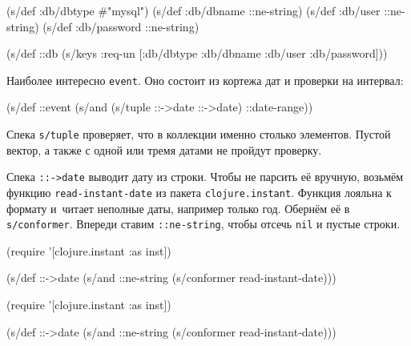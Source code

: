 \begin{english}
  \begin{clojure}
(s/def :db/dbtype   #{"mysql"})
(s/def :db/dbname   ::ne-string)
(s/def :db/user     ::ne-string)
(s/def :db/password ::ne-string)

(s/def ::db
  (s/keys :req-un [:db/dbtype
                   :db/dbname
                   :db/user
                   :db/password]))
  \end{clojure}
\end{english}

Наиболее интересно \verb|event|. Оно состоит из кортежа дат и проверки на
интервал:

\begin{english}
  \begin{clojure}
(s/def ::event
  (s/and (s/tuple ::->date ::->date)
         ::date-range))
  \end{clojure}
\end{english}


Спека \verb|s/tuple| проверяет, что в коллекции именно столько элементов. Пустой
вектор, а также с одной или тремя датами не пройдут проверку.

Спека \verb|::->date| выводит дату из строки. Чтобы не парсить её вручную,
возьмём функцию \verb|read-instant-date| из пакета \verb|clojure.instant|.
Функция лояльна к формату и~читает неполные даты, например только год.  Обернём
её в \verb|s/conformer|. Впереди ставим \verb|::ne-string|, чтобы отсечь
\verb|nil| и пустые строки.


\ifx\DEVICETYPE\MOBILE

\begin{english}
  \begin{clojure}
(require '[clojure.instant :as inst])

(s/def ::->date
  (s/and ::ne-string
    (s/conformer read-instant-date)))
  \end{clojure}
\end{english}

\else

\begin{english}
  \begin{clojure}
(require '[clojure.instant :as inst])

(s/def ::->date
  (s/and ::ne-string (s/conformer read-instant-date)))
  \end{clojure}
\end{english}

